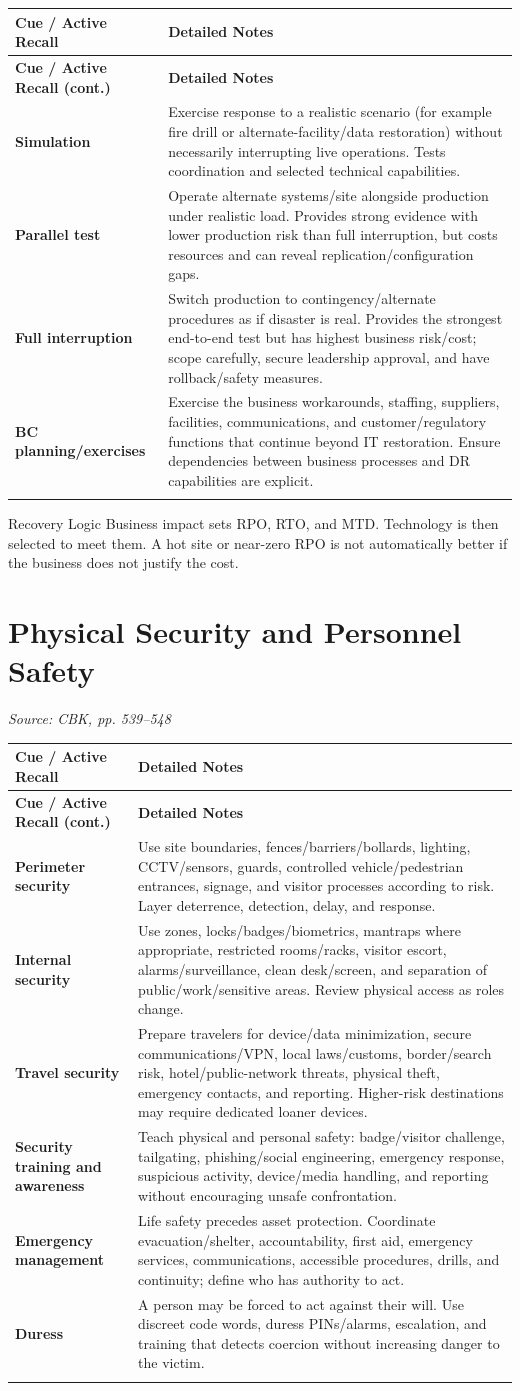 \documentclass[10pt,letterpaper]{article}
\makeatletter
\newenvironment{cornell}{\rowcolors{2}{white}{notebg}\begin{longtable}{@{}>{\raggedright\arraybackslash\columncolor{cuebg}\color{navy}\bfseries}p{0.285\textwidth}>{\raggedright\arraybackslash}p{0.65\textwidth}@{}}\rowcolor{navy}\color{white}\textbf{Cue / Active Recall} & \color{white}\textbf{Detailed Notes}\\ \hline\endfirsthead\rowcolor{navy}\color{white}\textbf{Cue / Active Recall (cont.)} & \color{white}\textbf{Detailed Notes}\\ \hline\endhead}{\end{longtable}}
\newcommand{\noterow}[2]{#1 & #2\\\arrayrulecolor{line}\hline}\newcommand{\source}[1]{\par{\footnotesize\color{teal}\textit{Source: CBK, #1}}\par}
\makeatother
\begin{document}
\begin{cornell}
\noterow{Simulation}{Exercise response to a realistic scenario (for example fire drill or alternate-facility/data restoration) without necessarily interrupting live operations. Tests coordination and selected technical capabilities.}
\noterow{Parallel test}{Operate alternate systems/site alongside production under realistic load. Provides strong evidence with lower production risk than full interruption, but costs resources and can reveal replication/configuration gaps.}
\noterow{Full interruption}{Switch production to contingency/alternate procedures as if disaster is real. Provides the strongest end-to-end test but has highest business risk/cost; scope carefully, secure leadership approval, and have rollback/safety measures.}
\noterow{BC planning/exercises}{Exercise the business workarounds, staffing, suppliers, facilities, communications, and customer/regulatory functions that continue beyond IT restoration. Ensure dependencies between business processes and DR capabilities are explicit.}
\end{cornell}

\begin{exambox}{Recovery Logic}
Business impact sets RPO, RTO, and MTD. Technology is then selected to meet them. A hot site or near-zero RPO is not automatically better if the business does not justify the cost.
\end{exambox}

\section{\color{navy}Physical Security and Personnel Safety}
\source{pp. 539--548}
\begin{cornell}
\noterow{Perimeter security}{Use site boundaries, fences/barriers/bollards, lighting, CCTV/sensors, guards, controlled vehicle/pedestrian entrances, signage, and visitor processes according to risk. Layer deterrence, detection, delay, and response.}
\noterow{Internal security}{Use zones, locks/badges/biometrics, mantraps where appropriate, restricted rooms/racks, visitor escort, alarms/surveillance, clean desk/screen, and separation of public/work/sensitive areas. Review physical access as roles change.}
\noterow{Travel security}{Prepare travelers for device/data minimization, secure communications/VPN, local laws/customs, border/search risk, hotel/public-network threats, physical theft, emergency contacts, and reporting. Higher-risk destinations may require dedicated loaner devices.}
\noterow{Security training and awareness}{Teach physical and personal safety: badge/visitor challenge, tailgating, phishing/social engineering, emergency response, suspicious activity, device/media handling, and reporting without encouraging unsafe confrontation.}
\noterow{Emergency management}{Life safety precedes asset protection. Coordinate evacuation/shelter, accountability, first aid, emergency services, communications, accessible procedures, drills, and continuity; define who has authority to act.}
\noterow{Duress}{A person may be forced to act against their will. Use discreet code words, duress PINs/alarms, escalation, and training that detects coercion without increasing danger to the victim.}
\end{cornell}
\end{document}
